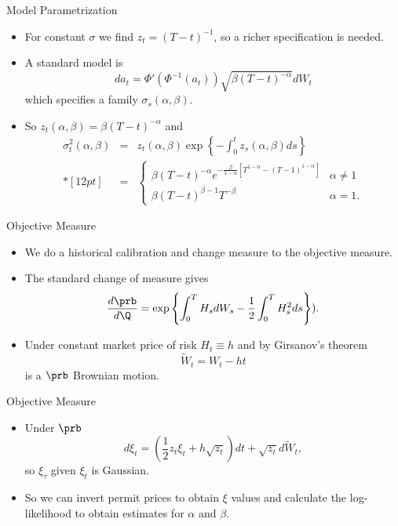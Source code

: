 
{Model Parametrization}
\begin{itemize}
\item<1-> For constant $\sigma$ we find $z_t=(T-t)^{-1}$, so a richer specification is needed.
\item<2-> A standard model is
$$
da_t = \Phi'\left(\Phi^{-1}(a_t)\right)\sqrt{\beta(T-t)^{-\alpha}}dW_t
$$
which specifies a family $\sigma_s(\alpha,\beta)$.
\item<3->
So $z_t(\alpha, \beta) = \beta(T-t)^{-\alpha}$ and
$$
\begin{array}{lll}
\sigma_t^2(\alpha,\beta)&=& \displaystyle z_t(\alpha, \beta) \exp\left\{-\int_0^t z_s(\alpha, \beta) ds \right\}\\*[12pt]
&=&\displaystyle
\left\{
\begin{array}{ll}
\beta(T-t)^{-\alpha} e^{-\frac{\beta}{1-\alpha}[T^{1-\alpha}-(T-1)^{1-\alpha}]} &\alpha \not=1\\
\beta(T-t)^{\beta-1}T^{-\beta} &\alpha=1.
\end{array}
\right.
\end{array}
$$
\end{itemize}

{Objective Measure}
\begin{itemize}
\item<1-> We do a historical calibration and change measure to the objective measure.
\item<2-> The standard change of measure gives
$$
\frac{d\prb}{d\Q} = \exp\left\{\int_0^T H_s dW_s -\frac{1}{2} \int_0^T H_s^2ds \right\}).
$$
\item<3->
Under constant market price of risk $H_t \equiv h$ and by Girsanov's theorem
$$
\tilde{W}_t = W_t - ht
$$
is a $\prb$ Brownian motion.
\end{itemize}

{Objective Measure}
\begin{itemize}
\item<1->
Under $\prb$
$$
d\xi_t = \left(\frac{1}{2} z_t \xi_t + h \sqrt{z_t} \right)dt + \sqrt{z_t} d\tilde{W}_t,
$$
so $\xi_{\tau}$ given $\xi_t$ is Gaussian.
\item<2-> So we can invert permit prices to obtain $\xi$ values and calculate the log-likelihood to obtain
estimates for $\alpha$ and $\beta$.
\end{itemize}

